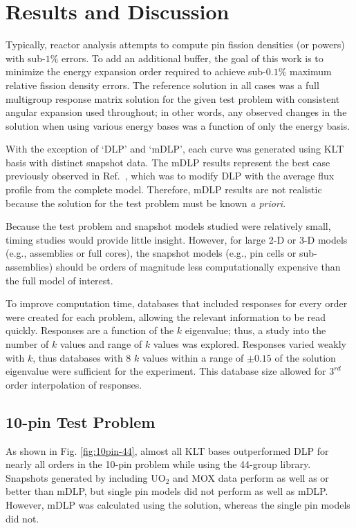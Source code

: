 \documentclass[5p,times,twocolumn,10pt]{elsarticle}
\newcommand{\REF}[1]{Ref.~\citen{#1}}               %
\begin{document}
  \section{Results and Discussion}
  
  Typically, reactor analysis attempts to compute pin fission densities 
  (or powers) with sub-$1\%$ errors.  To add an additional 
  buffer, the goal of this work is to minimize the energy expansion order 
  required to achieve sub-$0.1\%$ maximum relative fission density errors.
  The reference solution in all cases was a full multigroup response matrix solution for the given test problem
  with consistent angular expansion used throughout; in other words, any observed
  changes in the solution when using various energy bases was a 
  function of only the energy basis.
  
  With the exception of `DLP' and `mDLP', each curve was generated using KLT basis with distinct snapshot data.
  The mDLP results represent the best case previously observed in \REF{Roberts2014}, which was to modify DLP with
  the average flux profile from the complete model.  Therefore, mDLP results are not realistic because the solution
  for the test problem must be known {\it a priori}.
  
  Because the test problem and snapshot models studied were relatively small, timing studies would 
  provide little insight.  However, for large 2-D or 3-D models (e.g., assemblies or full cores), the snapshot
  models (e.g., pin cells or sub-assemblies) should be orders of magnitude less computationally expensive
  than the full model of interest.
  
  To improve computation time, databases that included responses for every order were created for each problem, 
  allowing the relevant information to be read quickly.  Responses are a function of the $k$ eigenvalue; thus, a study into
  the number of $k$ values and range of $k$ values was explored.  Responses varied weakly with $k$, thus databases with 8 $k$ values
  within a range of $\pm0.15$ of the solution eigenvalue were sufficient for the experiment.  This database size allowed
  for $3^{rd}$ order interpolation of responses.
  
  \subsection{10-pin Test Problem}
  
  As shown in Fig. \ref{fig:10pin-44}, almost all KLT bases outperformed DLP for nearly all orders in the 10-pin problem while using the 44-group library.  
  Snapshots generated by including UO$_2$ and MOX data perform as well as or better than mDLP, but single pin
  models did not perform as well as mDLP.  However, mDLP was calculated using the solution, whereas the single pin models did not.
  
\end{document}
